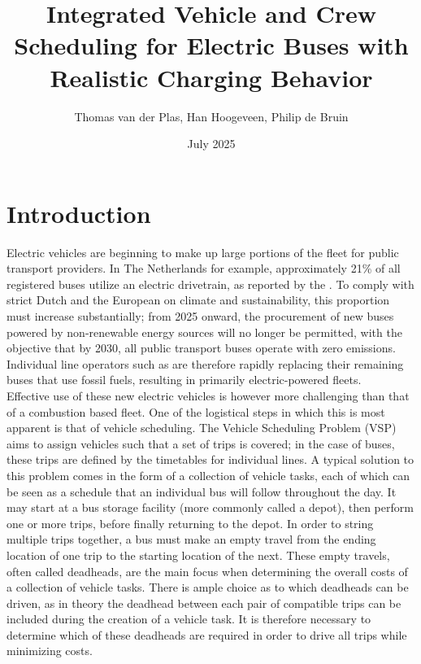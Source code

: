 \documentclass[]{article}
\title{Integrated Vehicle and Crew Scheduling for Electric Buses with Realistic Charging Behavior}
\date{July 2025}
\author{Thomas van der Plas, Han Hoogeveen, Philip de Bruin}
\begin{document}
\maketitle

\section{Introduction}
Electric vehicles are beginning to make up large portions of the fleet for public transport providers. In The Netherlands for example, approximately 21\% of all registered buses utilize an electric drivetrain, as reported by the \citet{RDW}. To comply with strict Dutch and the European \citet{europaRegulation20181999} on climate and sustainability, this proportion must increase substantially; from 2025 onward, the procurement of new buses powered by non-renewable energy sources will no longer be permitted, with the objective that by 2030, all public transport buses operate with zero emissions. Individual line operators such as \citet{qbuzzQbuzz} are therefore rapidly replacing their remaining buses that use fossil fuels, resulting in primarily electric-powered fleets. \\
Effective use of these new electric vehicles is however more challenging than that of a combustion based fleet. One of the logistical steps in which this is most apparent is that of vehicle scheduling. The Vehicle Scheduling Problem (VSP) aims to assign vehicles such that a set of trips is covered; in the case of buses, these trips are defined by the timetables for individual lines. A typical solution to this problem comes in the form of a collection of vehicle tasks, each of which can be seen as a schedule that an individual bus will follow throughout the day. It may start at a bus storage facility (more commonly called a depot), then perform one or more trips, before finally returning to the depot. In order to string multiple trips together, a bus must make an empty travel from the ending location of one trip to the starting location of the next. These empty travels, often called deadheads, are the main focus when determining the overall costs of a collection of vehicle tasks. There is ample choice as to which deadheads can be driven, as in theory the deadhead between each pair of compatible trips can be included during the creation of a vehicle task. It is therefore necessary to determine which of these deadheads are required in order to drive all trips while minimizing costs. \\
\end{document}
